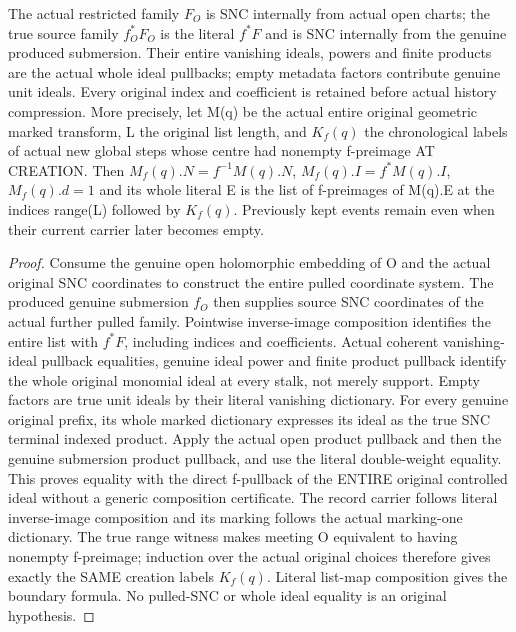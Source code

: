 \begin{lemma}
\label{hir:submersion-image-trace-whole-dictionary}
\leanok
{}
The actual restricted family $F_O$ is SNC internally from actual open charts; the true source family $f_O^*F_O$ is the literal $f^*F$ and is SNC internally from the genuine produced submersion. Their entire vanishing ideals, powers and finite products are the actual whole ideal pullbacks; empty metadata factors contribute genuine unit ideals. Every original index and coefficient is retained before actual history compression. More precisely, let M(q) be the actual entire original geometric marked transform, L the original list length, and $K_f(q)$ the chronological labels of actual new global steps whose centre had nonempty f-preimage AT CREATION. Then $M_f(q).N=f^{-1}M(q).N$, $M_f(q).I=f^*M(q).I$, $M_f(q).d=1$ and its whole literal E is the list of f-preimages of M(q).E at the indices range(L) followed by $K_f(q)$. Previously kept events remain even when their current carrier later becomes empty.
\end{lemma}
\begin{proof}
Consume the genuine open holomorphic embedding of O and the actual original SNC coordinates to construct the entire pulled coordinate system. The produced genuine submersion $f_O$ then supplies source SNC coordinates of the actual further pulled family. Pointwise inverse-image composition identifies the entire list with $f^*F$, including indices and coefficients. Actual coherent vanishing-ideal pullback equalities, genuine ideal power and finite product pullback identify the whole original monomial ideal at every stalk, not merely support. Empty factors are true unit ideals by their literal vanishing dictionary. For every genuine original prefix, its whole marked dictionary expresses its ideal as the true SNC terminal indexed product. Apply the actual open product pullback and then the genuine submersion product pullback, and use the literal double-weight equality. This proves equality with the direct f-pullback of the ENTIRE original controlled ideal without a generic composition certificate. The record carrier follows literal inverse-image composition and its marking follows the actual marking-one dictionary. The true range witness makes meeting O equivalent to having nonempty f-preimage; induction over the actual original choices therefore gives exactly the SAME creation labels $K_f(q)$. Literal list-map composition gives the boundary formula. No pulled-SNC or whole ideal equality is an original hypothesis.
\end{proof}

